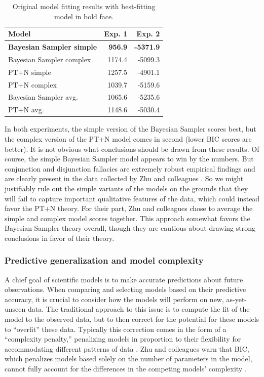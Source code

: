 \documentclass[
  english,
  man,floatsintext]{apa6}
\begin{document}
\begin{table}

\caption{\label{tab:table1}Original model fitting results with best-fitting model in bold face.}
\centering
\begin{tabular}[t]{lrr}
\toprule
Model & Exp. 1 & Exp. 2\\
\midrule
\textbf{Bayesian Sampler simple} & \textbf{956.9} & \textbf{-5371.9}\\
Bayesian Sampler complex & 1174.4 & -5099.3\\
PT+N simple & 1257.5 & -4901.1\\
PT+N complex & 1039.7 & -5159.6\\
Bayesian Sampler avg. & 1065.6 & -5235.6\\
\addlinespace
PT+N avg. & 1148.6 & -5030.4\\
\bottomrule
\end{tabular}
\end{table}

In both experiments, the simple version of the Bayesian Sampler scores best, but the complex version of the PT+N model comes in second (lower BIC scores are better). It is not obvious what conclusions should be drawn from these results. Of course, the simple Bayesian Sampler model appears to win by the numbers. But conjunction and disjunction fallacies are extremely robust empirical findings \autocite{mellers.etal2001,sides.etal2002} and are clearly present in the data collected by Zhu and colleagues \autocite*{zhu.etal2020}. So we might justifiably rule out the simple variants of the models on the grounds that they will fail to capture important qualitative features of the data, which could instead favor the PT+N theory. For their part, Zhu and colleagues \autocite*{zhu.etal2020} chose to average the simple and complex model scores together. This approach somewhat favors the Bayesian Sampler theory overall, though they are cautious about drawing strong conclusions in favor of their theory.

\hypertarget{predictive-generalization-and-model-complexity}{%
\subsubsection{Predictive generalization and model complexity}\label{predictive-generalization-and-model-complexity}}

A chief goal of scientific models is to make accurate predictions about future observations. When comparing and selecting models based on their predictive accuracy, it is crucial to consider how the models will perform on new, as-yet-unseen data. The traditional approach to this issue is to compute the fit of the model to the observed data, but to then correct for the potential for these models to ``overfit'' these data. Typically this correction comes in the form of a ``complexity penalty,'' penalizing models in proportion to their flexibility for accommodating different patterns of data \autocite{gelman.etal2014}. Zhu and colleagues \autocite*{zhu.etal2020} warn that BIC, which penalizes models based solely on the number of parameters in the model, cannot fully account for the differences in the competing models' complexity \autocite[also see][]{piantadosi2018}.
\end{document}

